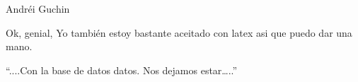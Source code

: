 \begin{IEEEbiography}{Andréi Guchin}

Ok, genial, Yo también estoy bastante aceitado con latex asi que puedo dar una mano.

“....Con la base de datos datos. Nos dejamos estar…..”


\end{IEEEbiography}

